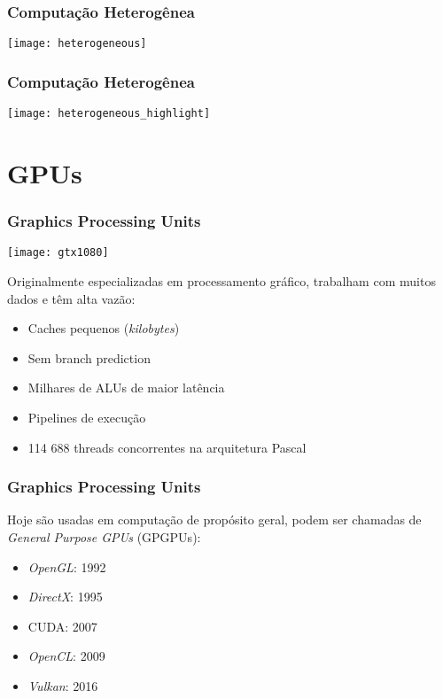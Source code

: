 \documentclass[10pt, compress]{beamer}
\begin{document}
\begin{frame}
    \frametitle{Computação Heterogênea}
    \centering
    \texttt{[image: heterogeneous]}
\end{frame}

\begin{frame}
    \frametitle{Computação Heterogênea}
    \centering
    \texttt{[image: heterogeneous\_highlight]}
\end{frame}

\section{GPUs}

\begin{frame}
    \frametitle{Graphics Processing Units}
    \begin{center}
        \texttt{[image: gtx1080]}
    \end{center}

    Originalmente especializadas em \alert{processamento gráfico},
    trabalham com muitos dados e têm \alert{alta vazão}:

    \begin{itemize}
        \item Caches pequenos (\textit{kilobytes})
        \item Sem \alert{branch prediction}
        \item \alert{Milhares} de ALUs de \alert{maior latência}
        \item \alert{Pipelines} de execução
        \item 114 688 \alert{threads} concorrentes na arquitetura Pascal
    \end{itemize}
\end{frame}

\begin{frame}
    \frametitle{Graphics Processing Units}
    Hoje são usadas em computação de propósito geral, podem ser chamadas de
    \textit{General Purpose GPUs} (GPGPUs):
    \begin{itemize}
        \item \textit{OpenGL}: 1992
        \item \textit{DirectX}: 1995
        \item \alert{CUDA}: 2007
        \item \textit{OpenCL}: 2009
        \item \textit{Vulkan}: 2016
    \end{itemize}
\end{frame}
\end{document}
